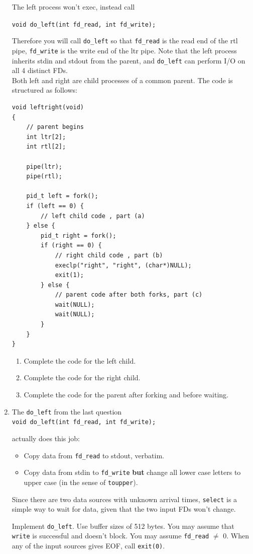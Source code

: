 \documentclass[11pt]{article}
\begin{document}
\begin{enumerate}
		The left process won't exec, instead call

		\Verb|void do_left(int fd_read, int fd_write);|

		Therefore you will call \Verb|do_left| so that \Verb|fd_read| is the read end of the rtl pipe, \Verb|fd_write| is the write end of the ltr pipe. Note that the left process inherits stdin and stdout from the parent, and \Verb|do_left| can perform I/O on all 4 distinct FDs.\\
		Both left and right are child processes of a common parent. The code is structured as follows:
		\begin{Verbatim}
void leftright(void)
{
	// parent begins
	int ltr[2];
	int rtl[2];

	pipe(ltr);
	pipe(rtl);

	pid_t left = fork();
	if (left == 0) {
		// left child code , part (a)
	} else {
		pid_t right = fork();
		if (right == 0) {
			// right child code , part (b)
			execlp("right", "right", (char*)NULL);
			exit(1);
		} else {
			// parent code after both forks, part (c)
			wait(NULL);
			wait(NULL);
		}
	}
}
		\end{Verbatim}
			\newpage
			\begin{enumerate}
				\item Complete the code for the left child.
					
				\item Complete the code for the right child.
					
				\item Complete the code for the parent after forking and before waiting.
					
			\end{enumerate}

	\newpage
	\item The \Verb|do_left| from the last question\\
	\Verb|void do_left(int fd_read, int fd_write);|

	actually does this job:
		\begin{itemize}
			\item Copy data from \Verb|fd_read| to stdout, verbatim.
			\item Copy data from stdin to \Verb|fd_write| \textbf{but} change all lower case letters to upper case (in the sense of \Verb|toupper|).
		\end{itemize}
		Since there are two data sources with unknown arrival times, \Verb|select| is a simple way to wait for data, given that the two input FDs won’t change.

		Implement \Verb|do_left|. Use buffer sizes of 512 bytes. You may assume that \Verb|write| is successful and doesn’t block. You may assume \Verb|fd_read| $ \ne $ 0. When any of the input sources gives EOF, call \Verb|exit(0)|.
			
\end{enumerate}
\end{document}
